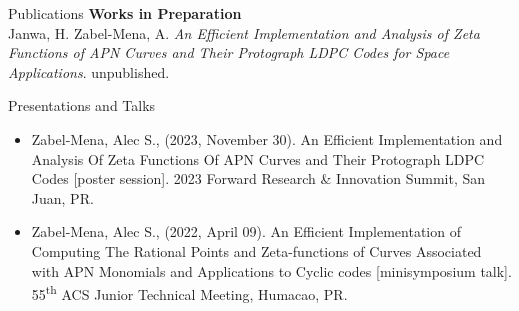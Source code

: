 \documentclass{resume} %
\begin{document}
\begin{rSection}{Publications}
    \textbf{Works in Preparation} \\
    \hspace*{10mm} Janwa, H. Zabel-Mena, A. \textit{An Efficient Implementation and Analysis of Zeta Functions of APN Curves
and Their Protograph LDPC Codes for Space Applications}.
    \hspace*{10mm} unpublished.
\end{rSection}

\begin{rSection}{Presentations and Talks}
    \begin{itemize}

        \item Zabel-Mena, Alec S., (2023, November 30). An Efficient Implementation and
            Analysis Of Zeta Functions Of APN Curves and Their Protograph LDPC
            Codes [poster session]. 2023 Forward Research & Innovation Summit,
            San Juan, PR.

        \item Zabel-Mena, Alec S., (2022, April 09). An Efficient Implementation
            of Computing The Rational Points and Zeta-functions of Curves Associated
            with APN Monomials and Applications to Cyclic codes [minisymposium
            talk]. 55\textsuperscript{th} ACS Junior Technical Meeting, Humacao,
            PR.
    \end{itemize}
\end{rSection}
\end{document}
